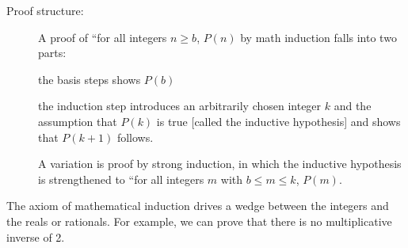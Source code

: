 \documentclass[12pt]{article}
\begin{document}
\begin{description}
\item[Proof structure:]  A proof of ``for all integers $n \geq b$, $P(n)$ by math induction falls into two parts:

the basis steps shows $P(b)$

the induction step introduces an arbitrarily chosen integer $k$ and the assumption that $P(k)$ is true [called the inductive hypothesis] and shows that $P(k+1)$ follows.

A variation is proof by strong induction, in which the inductive hypothesis is strengthened to ``for all integers $m$ with $b \leq m \leq k$, $P(m)$.

\end{description}

The axiom of mathematical induction drives a wedge between the integers and the reals or rationals.  For example, we can prove that there is no multiplicative inverse of 2.
\end{document}
